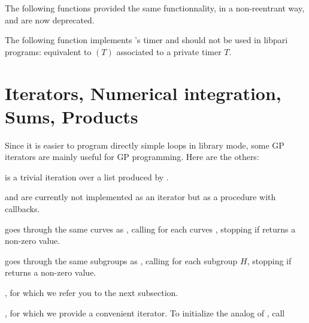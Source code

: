 The following functions provided the same functionnality, in a
non-reentrant way, and are now deprecated.




The following function implements 's timer and should not be used in
libpari programs:
 equivalent to $(T)$ associated to a
private timer $T$.

\section{Iterators, Numerical integration, Sums, Products}
Since it is easier to program directly simple loops in library mode, some GP
iterators are mainly useful for GP programming. Here are the others:

\item {} is a trivial iteration over a list produced by
.

\item {} and  are currently not implemented as an
iterator but as a procedure with callbacks.

goes through the same curves as , calling
 for each curves , stopping if  returns a
non-zero value.

goes through the same subgroups as , calling
 for each subgroup $H$, stopping if  returns a
non-zero value.

\item {}, for which we refer you to the next subsection.

\item {}, for which we provide a convenient iterator. To
initialize the analog of , call

